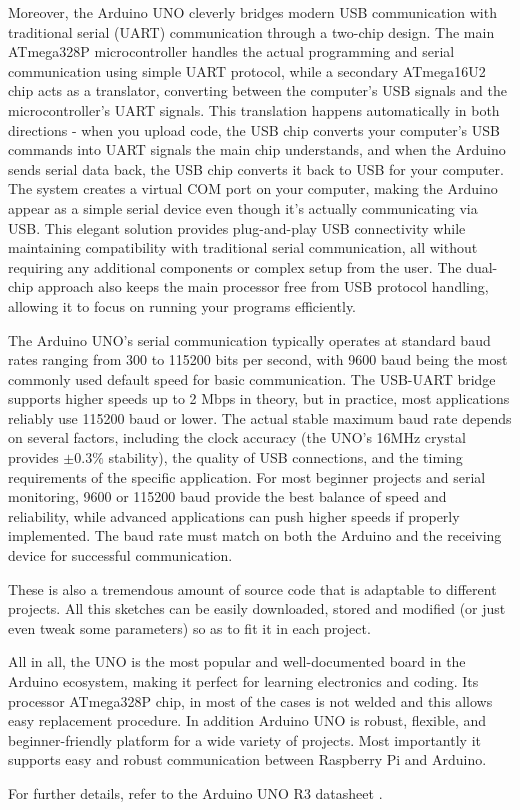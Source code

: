 {	Moreover, the Arduino UNO cleverly bridges modern USB communication with traditional serial (UART) communication through a two-chip design. The main ATmega328P microcontroller handles the actual programming and serial communication using simple UART protocol, while a secondary ATmega16U2 chip acts as a translator, converting between the computer's USB signals and the microcontroller's UART signals. This translation happens automatically in both directions - when you upload code, the USB chip converts your computer's USB commands into UART signals the main chip understands, and when the Arduino sends serial data back, the USB chip converts it back to USB for your computer. The system creates a virtual COM port on your computer, making the Arduino appear as a simple serial device even though it's actually communicating via USB. This elegant solution provides plug-and-play USB connectivity while maintaining compatibility with traditional serial communication, all without requiring any additional components or complex setup from the user. The dual-chip approach also keeps the main processor free from USB protocol handling, allowing it to focus on running your programs efficiently.
	
	The Arduino UNO's serial communication typically operates at standard baud rates ranging from 300 to 115200 bits per second, with 9600 baud being the most commonly used default speed for basic communication. The USB-UART bridge supports higher speeds up to 2 Mbps in theory, but in practice, most applications reliably use 115200 baud or lower. The actual stable maximum baud rate depends on several factors, including the clock accuracy (the UNO's 16MHz crystal provides $\pm 0.3\%$ stability), the quality of USB connections, and the timing requirements of the specific application. For most beginner projects and serial monitoring, 9600 or 115200 baud provide the best balance of speed and reliability, while advanced applications can push higher speeds if properly implemented. The baud rate must match on both the Arduino and the receiving device for successful communication.
	
	These is also a tremendous amount of source code that is adaptable to different projects. All this sketches can be easily downloaded, stored and modified (or just even tweak some parameters) so as to fit it in each project.
	
	All in all, the UNO is the most popular and well-documented board in the Arduino ecosystem, making it perfect for learning electronics and coding. Its processor ATmega328P chip, in most of the cases is not welded and this allows easy replacement procedure. In addition Arduino UNO is robust, flexible, and beginner-friendly platform for a wide variety of projects. Most importantly it supports easy and robust communication between Raspberry Pi and Arduino.
	
	For further details, refer to the Arduino UNO R3 datasheet  \cite{Arduino}.
}


